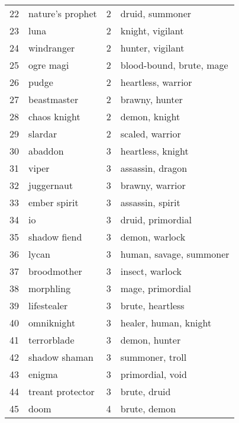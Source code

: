 \documentclass{article}
\begin{document}
\begin{table}
{\begin{tabular}{llrl}
22 &     nature's prophet &      2 &                druid, summoner \\
23 &                 luna &      2 &               knight, vigilant \\
24 &           windranger &      2 &               hunter, vigilant \\
25 &            ogre magi &      2 &       blood-bound, brute, mage \\
26 &                pudge &      2 &            heartless, warrior  \\
27 &          beastmaster &      2 &                 brawny, hunter \\
28 &         chaos knight &      2 &                  demon, knight \\
29 &              slardar &      2 &               scaled, warrior  \\
30 &              abaddon &      3 &              heartless, knight \\
31 &                viper &      3 &               assassin, dragon \\
32 &           juggernaut &      3 &               brawny, warrior  \\
33 &         ember spirit &      3 &               assassin, spirit \\
34 &                   io &      3 &              druid, primordial \\
35 &         shadow fiend &      3 &                demon, warlock  \\
36 &                lycan &      3 &        human, savage, summoner \\
37 &          broodmother &      3 &               insect, warlock  \\
38 &            morphling &      3 &               mage, primordial \\
39 &          lifestealer &      3 &               brute, heartless \\
40 &           omniknight &      3 &          healer, human, knight \\
41 &          terrorblade &      3 &                  demon, hunter \\
42 &        shadow shaman &      3 &                summoner, troll \\
43 &               enigma &      3 &               primordial, void \\
44 &     treant protector &      3 &                   brute, druid \\
45 &                 doom &      4 &                   brute, demon \\

\end{tabular}}
\end{table}
\end{document}
